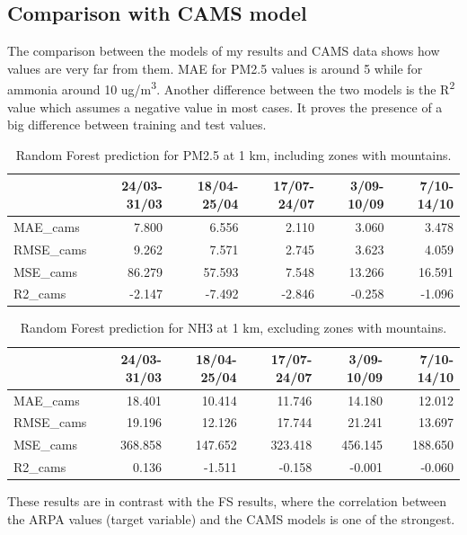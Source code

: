 \subsection{Comparison with CAMS model}
The comparison between the models of my results and CAMS data shows how values are very far from them. MAE for PM2.5 values is around 5 while for ammonia around 10 ug/m\textsuperscript{3}. 
Another difference between the two models is the R\textsuperscript{2} value which assumes a negative value in most cases. It proves the presence of a big difference between training and test values. 


\begin{table}[H]
\begin{tabular}{lrrrrr}
\toprule
  &  24/03-31/03 &  18/04-25/04 &  17/07-24/07 &  3/09-10/09 &  7/10-14/10 \\
\midrule
  MAE\_cams &        7.800 &        6.556 &        2.110 &       3.060 &       3.478 \\
  RMSE\_cams &        9.262 &        7.571 &        2.745 &       3.623 &       4.059 \\
   MSE\_cams &       86.279 &       57.593 &        7.548 &      13.266 &      16.591 \\
    R2\_cams &       -2.147 &       -7.492 &       -2.846 &      -0.258 &      -1.096 \\
\bottomrule
\end{tabular}
\caption{Random Forest prediction for PM2.5 at 1 km, including zones with mountains.}
\end{table}
\begin{table}[H]
\begin{tabular}{lrrrrr}
\toprule
  &  24/03-31/03 &  18/04-25/04 &  17/07-24/07 &  3/09-10/09 &  7/10-14/10 \\
\midrule
   MAE\_cams &       18.401 &       10.414 &       11.746 &      14.180 &      12.012 \\
  RMSE\_cams &       19.196 &       12.126 &       17.744 &      21.241 &      13.697 \\
   MSE\_cams &      368.858 &      147.652 &      323.418 &     456.145 &     188.650 \\
    R2\_cams &        0.136 &       -1.511 &       -0.158 &      -0.001 &      -0.060 \\
\bottomrule
\end{tabular}
\caption{Random Forest prediction for NH3 at 1 km, excluding zones with mountains.}
\end{table}
These results are in contrast with the FS results, where the correlation between the ARPA values (target variable) and the CAMS models is one of the strongest.
